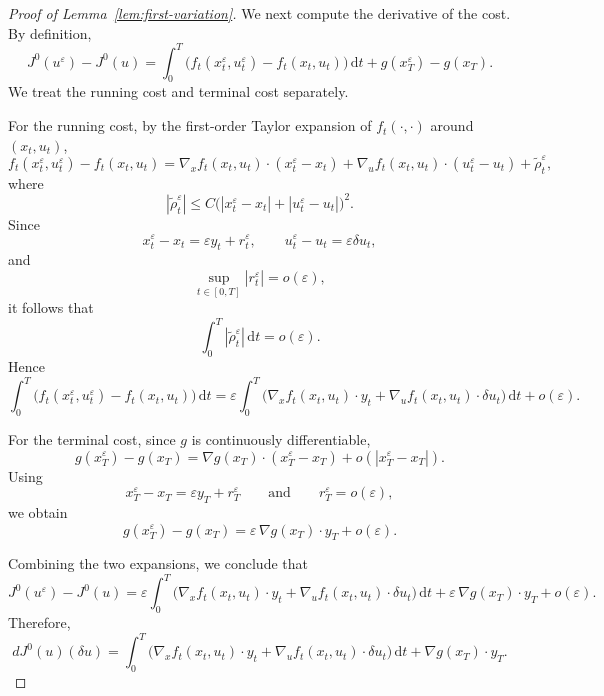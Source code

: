 \documentclass[11pt]{amsart}
\theoremstyle{plain}
\theoremstyle{definition}
\theoremstyle{remark}
\newcommand{\dd}{\,\mathrm{d}}
\begin{document}
\begin{proof}[Proof of Lemma~\ref{lem:first-variation}]
We next compute the derivative of the cost.
By definition,
\[
J^0(u^\varepsilon)-J^0(u)
=
\int_0^T \Big(f_t(x_t^\varepsilon,u_t^\varepsilon)-f_t(x_t,u_t)\Big)\dd t
+
g(x_T^\varepsilon)-g(x_T).
\]
We treat the running cost and terminal cost separately.

For the running cost, by the first-order Taylor expansion of $f_t(\cdot,\cdot)$
around $(x_t,u_t)$,
\[
f_t(x_t^\varepsilon,u_t^\varepsilon)-f_t(x_t,u_t)
=
\nabla_x f_t(x_t,u_t)\cdot (x_t^\varepsilon-x_t)
+
\nabla_u f_t(x_t,u_t)\cdot (u_t^\varepsilon-u_t)
+
\tilde\rho_t^\varepsilon,
\]
where
\[
|\tilde\rho_t^\varepsilon|
\le
C\Big(|x_t^\varepsilon-x_t|+|u_t^\varepsilon-u_t|\Big)^2.
\]
Since
\[
x_t^\varepsilon-x_t=\varepsilon y_t+r_t^\varepsilon,
\qquad
u_t^\varepsilon-u_t=\varepsilon \delta u_t,
\]
and
\[
\sup_{t\in[0,T]}|r_t^\varepsilon|=o(\varepsilon),
\]
it follows that
\[
\int_0^T |\tilde\rho_t^\varepsilon|\dd t=o(\varepsilon).
\]
Hence
\[
\int_0^T \Big(f_t(x_t^\varepsilon,u_t^\varepsilon)-f_t(x_t,u_t)\Big)\dd t
=
\varepsilon\int_0^T
\Big(
\nabla_x f_t(x_t,u_t)\cdot y_t
+
\nabla_u f_t(x_t,u_t)\cdot \delta u_t
\Big)\dd t
+o(\varepsilon).
\]

For the terminal cost, since $g$ is continuously differentiable,
\[
g(x_T^\varepsilon)-g(x_T)
=
\nabla g(x_T)\cdot (x_T^\varepsilon-x_T)+o(|x_T^\varepsilon-x_T|).
\]
Using
\[
x_T^\varepsilon-x_T=\varepsilon y_T+r_T^\varepsilon
\qquad\text{and}\qquad
r_T^\varepsilon=o(\varepsilon),
\]
we obtain
\[
g(x_T^\varepsilon)-g(x_T)
=
\varepsilon\,\nabla g(x_T)\cdot y_T+o(\varepsilon).
\]

Combining the two expansions, we conclude that
\[
J^0(u^\varepsilon)-J^0(u)
=
\varepsilon\int_0^T
\Big(
\nabla_x f_t(x_t,u_t)\cdot y_t
+
\nabla_u f_t(x_t,u_t)\cdot \delta u_t
\Big)\dd t
+
\varepsilon\,\nabla g(x_T)\cdot y_T
+
o(\varepsilon).
\]
Therefore,
\begin{equation}\label{eq:pre-adjoint-first-variation}
dJ^0(u)(\delta u)
=
\int_0^T
\Big(
\nabla_x f_t(x_t,u_t)\cdot y_t
+
\nabla_u f_t(x_t,u_t)\cdot \delta u_t
\Big)\dd t
+
\nabla g(x_T)\cdot y_T.
\end{equation}


\end{proof}
\end{document}
